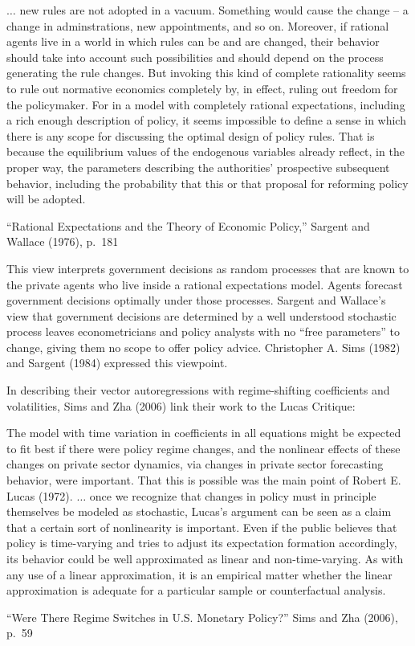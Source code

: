 \epigraph{$\ldots$ new rules are not adopted
in a vacuum. Something would cause the change -- a change in adminstrations,
new appointments, and so on. Moreover, if rational agents live in a world in
which rules can be and are changed, their behavior should take into account such
possibilities and should depend on the process generating the rule changes. But
invoking this kind of complete rationality seems to rule out normative economics
completely by, in effect, ruling out freedom for the policymaker. For in a model
with completely rational expectations, including a rich enough description
of policy, it seems impossible to define a sense in which there is any scope for
discussing the optimal design of policy rules. That is because the equilibrium
values of the endogenous variables already reflect, in the proper way, the
parameters
describing the authorities' prospective subsequent behavior, including
the probability that this or that proposal for reforming policy will be adopted.}
{``Rational Expectations and the Theory of Economic Policy,''
Sargent and Wallace (1976), p.~181}


%
%

This view interprets  government decisions as  random  processes
 that are known to the private agents who  live inside a rational expectations model.  
 Agents forecast   government decisions optimally  under those processes.
 Sargent and Wallace's   view that  government decisions  are
determined by a well understood stochastic  process  leaves  econometricians and policy analysts with
 no ``free parameters'' to change, giving them no scope  to offer policy advice.
 Christopher A. Sims (1982) and Sargent (1984) expressed  this viewpoint.
 
%
%

In describing  their vector autoregressions with regime-shifting coefficients and volatilities, Sims and Zha (2006)  link
their work to the Lucas Critique: %
\epigraph
{The model with time variation in coefficients in all equations might be expected to fit best if there 
were policy regime changes, and the nonlinear effects of these changes on private sector dynamics, via
 changes in private sector forecasting behavior, were important. That this is possible was the main point 
 of Robert E. Lucas (1972).
$\ldots$ %
once we recognize that changes in policy must in principle themselves be modeled as 
stochastic, Lucas's argument can be seen as a claim that a certain sort of nonlinearity is important. Even if the public believes that policy is time-varying and tries to adjust its expectation formation accordingly, its behavior could be well approximated as linear and non-time-varying. As with any use of a linear approximation, it is an empirical matter whether the linear approximation is adequate for a particular sample or counterfactual analysis.}{``Were There Regime  Switches in U.S. Monetary Policy?'' Sims and Zha (2006), p.~59}


